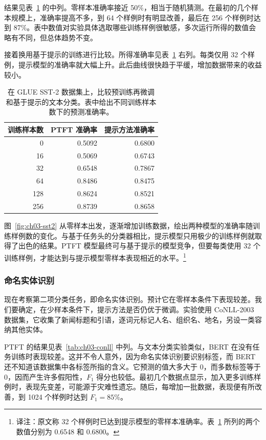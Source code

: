 结果见表~\ref{tab:ch03-sst2} 的中列。零样本准确率接近 50\%，相当于随机猜测。在最初的几个样本规模上，准确率提高不多，到 64 个样例时有明显改善，最后在 256 个样例时达到 87\%。表中数值对实验具体选取哪些训练样例很敏感，多次运行所得的数值会略有不同，但总体趋势不变。

接着换用基于提示的训练进行比较。所得准确率见表~\ref{tab:ch03-sst2} 右列。每类仅用 32 个样例，提示模型的准确率就大幅上升。此后曲线很快趋于平缓，增加数据带来的收益较小。

\begin{table}[!htbp]
\centering
\caption{在 GLUE SST-2 数据集上，比较预训练再微调和基于提示的文本分类。表中给出不同训练样本数下的预测准确率。}
\label{tab:ch03-sst2}
\begin{tabular}{@{}rrr@{}}
\toprule
训练样本数 & PTFT 准确率 & 提示方法准确率\\
\midrule
0 & 0.5092 & 0.6800\\
16 & 0.5069 & 0.6743\\
32 & 0.6548 & 0.7867\\
64 & 0.8486 & 0.8475\\
128 & 0.8624 & 0.8521\\
256 & 0.8739 & 0.8658\\
\bottomrule
\end{tabular}
\end{table}


图~\ref{fig:ch03-sst2} 从零样本出发，逐渐增加训练数据，绘出两种模型的准确率随训练样例数的变化。与基于任务头的分类器相比，提示模型只用极少的训练样例就取得了出色的结果。PTFT 模型最终可与基于提示的模型竞争，但要每类使用 32 个训练样例，才能达到与提示模型零样本表现相近的水平。\footnote{译注：原文称 32 个样例时已达到提示模型的零样本准确率。表~\ref{tab:ch03-sst2} 所列的两个数值分别为 0.6548 和 0.6800。}

\subsubsection{命名实体识别}
现在考察第二项分类任务，即命名实体识别。预计它在零样本条件下表现较差。我们要确定，在少样本条件下，提示方法是否仍优于微调。实验使用 CoNLL-2003 数据集，它收集了新闻标题和引语，逐词元标记人名、组织名、地名，另设一类容纳其他实体。

PTFT 的结果见表~\ref{tab:ch03-conll} 中列。与文本分类实验类似，BERT 在没有任务训练时表现较差。这并不令人意外，因为命名实体识别要识别标签，而 BERT 还不知道该数据集中各标签所指的含义。它预测的值大多大于 0，而多数标签等于 0，因而产生许多假阳性，$F_1$ 得分也较低。最初几个数据点显示，加入更多训练样例时，表现先变差，可能源于灾难性遗忘。随后，每增加一批数据，表现便有所改善，到 1024 个样例时达到 $F_1=85\%$。

